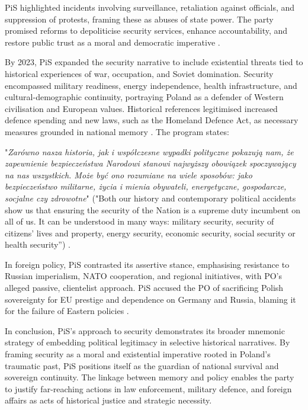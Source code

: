 PiS highlighted incidents involving surveillance, retaliation against officials, and suppression of protests, framing these as abuses of state power. The party promised reforms to depoliticise security services, enhance accountability, and restore public trust as a moral and democratic imperative \citep{pis_program_2014}.

By 2023, PiS expanded the security narrative to include existential threats tied to historical experiences of war, occupation, and Soviet domination. Security encompassed military readiness, energy independence, health infrastructure, and cultural-demographic continuity, portraying Poland as a defender of Western civilisation and European values. Historical references legitimised increased defence spending and new laws, such as the Homeland Defence Act, as necessary measures grounded in national memory \citep{pis_program_2023}. The program states:

\begin{displayquote}
    "\textit{Zarówno nasza historia, jak i współczesne wypadki polityczne pokazują nam, że zapewnienie bezpieczeństwa Narodowi stanowi najwyższy obowiązek spoczywający na nas wszystkich. Może być ono rozumiane na wiele sposobów: jako bezpieczeństwo militarne, życia i mienia obywateli, energetyczne, gospodarcze, socjalne czy zdrowotne}" ("Both our history and contemporary political accidents show us that ensuring the security of the Nation is a supreme duty incumbent on all of us. It can be understood in many ways: military security, security of citizens' lives and property, energy security, economic security, social security or health security”) \citep{pis_program_2023}.
\end{displayquote}

In foreign policy, PiS contrasted its assertive stance, emphasising resistance to Russian imperialism, NATO cooperation, and regional initiatives, with PO's alleged passive, clientelist approach. PiS accused the PO of sacrificing Polish sovereignty for EU prestige and dependence on Germany and Russia, blaming it for the failure of Eastern policies \citep{pis_program_2014}.

In conclusion, PiS's approach to security demonstrates its broader mnemonic strategy of embedding political legitimacy in selective historical narratives. By framing security as a moral and existential imperative rooted in Poland's traumatic past, PiS positions itself as the guardian of national survival and sovereign continuity. The linkage between memory and policy enables the party to justify far-reaching actions in law enforcement, military defence, and foreign affairs as acts of historical justice and strategic necessity.


